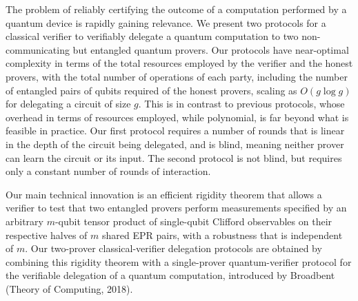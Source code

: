 The problem of reliably certifying the outcome of a computation performed by a quantum device is rapidly gaining relevance. We present two protocols for a classical verifier to verifiably delegate a quantum computation to two non-communicating but entangled quantum provers. Our protocols have near-optimal complexity in terms of the total resources employed by the verifier and the honest provers, with the total number of operations of each party, including the number of entangled pairs of qubits required of the honest provers, scaling as $O(g\log g)$ for delegating a circuit of size $g$. This is in contrast to previous protocols, whose overhead in terms of resources employed, while polynomial, is
far beyond what is feasible in practice. 
Our first protocol requires a number of rounds that is linear in the depth of the circuit being delegated, and is blind, meaning neither prover can learn the circuit or its input. The second protocol is not blind, but requires only a constant number of rounds of interaction. 

Our main technical innovation is an efficient rigidity theorem that allows a verifier to test that two entangled provers perform measurements specified by an arbitrary $m$-qubit tensor product of single-qubit Clifford observables on their respective halves of $m$ shared EPR pairs, with a robustness that is independent of $m$. Our two-prover classical-verifier delegation protocols are obtained by combining this rigidity theorem with a single-prover quantum-verifier protocol for the verifiable delegation of a quantum computation, introduced by Broadbent (Theory of Computing, 2018).